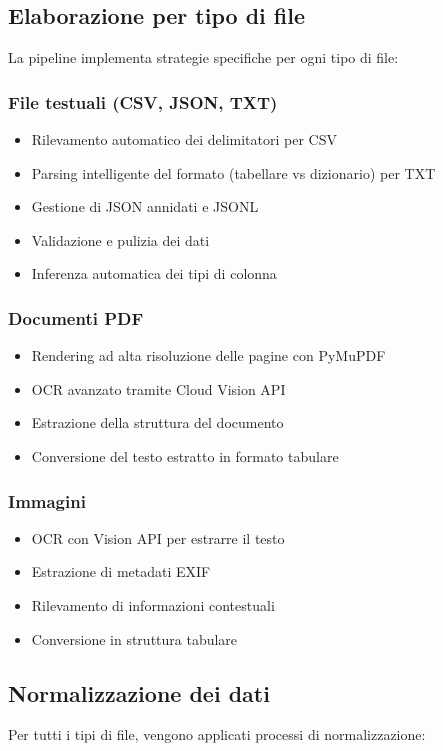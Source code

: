 \documentclass[11pt,a4paper,twoside]{report}
\begin{document}
\subsection{Elaborazione per tipo di file}

La pipeline implementa strategie specifiche per ogni tipo di file:

\subsubsection{File testuali (CSV, JSON, TXT)}
\begin{itemize}
    \item Rilevamento automatico dei delimitatori per CSV
    \item Parsing intelligente del formato (tabellare vs dizionario) per TXT
    \item Gestione di JSON annidati e JSONL
    \item Validazione e pulizia dei dati
    \item Inferenza automatica dei tipi di colonna
\end{itemize}

\subsubsection{Documenti PDF}
\begin{itemize}
    \item Rendering ad alta risoluzione delle pagine con PyMuPDF
    \item OCR avanzato tramite Cloud Vision API
    \item Estrazione della struttura del documento
    \item Conversione del testo estratto in formato tabulare
\end{itemize}

\subsubsection{Immagini}
\begin{itemize}
    \item OCR con Vision API per estrarre il testo
    \item Estrazione di metadati EXIF
    \item Rilevamento di informazioni contestuali
    \item Conversione in struttura tabulare
\end{itemize}

\subsection{Normalizzazione dei dati}
Per tutti i tipi di file, vengono applicati processi di normalizzazione:
\end{document}
